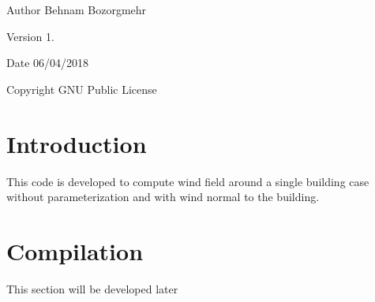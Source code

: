 \begin{DoxyAuthor}{Author}
Behnam Bozorgmehr 
\end{DoxyAuthor}
\begin{DoxyVersion}{Version}
1. 
\end{DoxyVersion}
\begin{DoxyDate}{Date}
06/04/2018 
\end{DoxyDate}
\begin{DoxyCopyright}{Copyright}
G\+NU Public License
\end{DoxyCopyright}
\hypertarget{index_intro_sec}{}\section{Introduction}\label{index_intro_sec}
This code is developed to compute wind field around a single building case without parameterization and with wind normal to the building. \hypertarget{index_compile_sec}{}\section{Compilation}\label{index_compile_sec}
This section will be developed later 